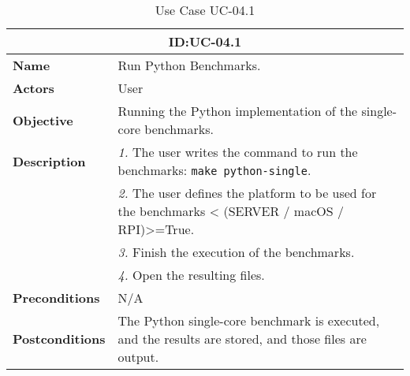 \begin{table}[H]
    \centering
    \begin{tabular}{l p{10cm}}
        \toprule
        \multicolumn{2}{c}{\textbf{ID:\@ UC-04.1}} \\
        \toprule
        \textbf{Name}                         &  Run Python Benchmarks. \\
        \textbf{Actors}                       &  User \\
        \textbf{Objective}                    &  Running the Python implementation of the single-core benchmarks. \\
        \multirow{1}{*}{\textbf{Description}} & \textsl{1.} The user writes the command to run the benchmarks: \texttt{make python-single}.\\
                                              & \textsl{2.} The user defines the platform to be used for the benchmarks < (SERVER / macOS / RPI)>=True.\\
                                              & \textsl{3.} Finish the execution of the benchmarks.\\
                                              & \textsl{4.} Open the resulting files.\\
        \textbf{Preconditions}                &  N/A \\
        \textbf{Postconditions}               &  The Python single-core benchmark is executed, and the results are stored, and those files are output. \\
    \end{tabular}
    \caption{Use Case UC-04.1}\label{tab:uc-04.1}
\end{table}

